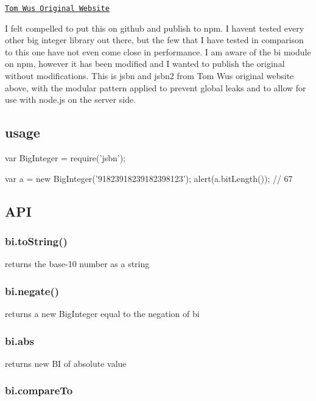 \href{http://www-cs-students.stanford.edu/~tjw/jsbn/}{\tt Tom Wu\textquotesingle{}s Original Website}

I felt compelled to put this on github and publish to npm. I haven\textquotesingle{}t tested every other big integer library out there, but the few that I have tested in comparison to this one have not even come close in performance. I am aware of the {\ttfamily bi} module on npm, however it has been modified and I wanted to publish the original without modifications. This is jsbn and jsbn2 from Tom Wu\textquotesingle{}s original website above, with the modular pattern applied to prevent global leaks and to allow for use with node.\+js on the server side.

\subsection*{usage}

\begin{DoxyVerb}var BigInteger = require('jsbn');

var a = new BigInteger('91823918239182398123');
alert(a.bitLength()); // 67
\end{DoxyVerb}


\subsection*{A\+PI}

\subsubsection*{bi.\+to\+String()}

returns the base-\/10 number as a string

\subsubsection*{bi.\+negate()}

returns a new Big\+Integer equal to the negation of {\ttfamily bi}

\subsubsection*{bi.\+abs}

returns new BI of absolute value

\subsubsection*{bi.\+compare\+To}

